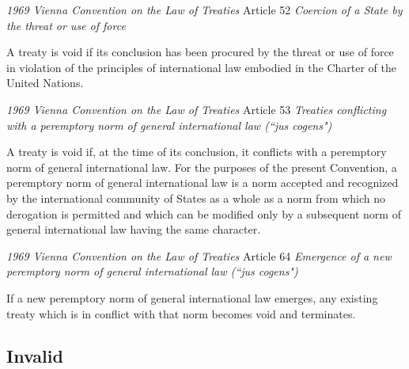 \begin{conventiondetails}{\textit{1969 Vienna Convention on the Law of Treaties} Article 52}
    \flushleft
    \textit{Coercion of a State by the threat or use of force}

    \vspace{\baselineskip}

    A treaty is void if its conclusion has been procured by the threat or use of force in violation of the  principles of international law embodied in the Charter of the United Nations.
\end{conventiondetails}

\begin{conventiondetails}{\textit{1969 Vienna Convention on the Law of Treaties} Article 53}
    \flushleft
    \textit{Treaties conflicting with a peremptory norm of general international law (``jus cogens")}

    \vspace{\baselineskip}

    A treaty is void if, at the time of its conclusion, it conflicts with a peremptory norm of general international law. For the purposes of the present Convention, a peremptory norm of general international law is a norm accepted and recognized by the international community of States as a whole as a norm from which no derogation is permitted and which can be modified only by a subsequent norm of general international law having the same character.
\end{conventiondetails}

\begin{conventiondetails}{\textit{1969 Vienna Convention on the Law of Treaties} Article 64}
    \flushleft
    \textit{Emergence of a new peremptory norm of general international law (``jus cogens")}

    \vspace{\baselineskip}

    If a new peremptory norm of general international law emerges, any existing treaty which is in  conflict with that norm becomes void and terminates.
\end{conventiondetails}

\subsection{Invalid}


